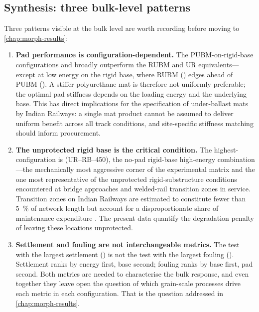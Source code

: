 \subsection{Synthesis: three bulk-level patterns}

Three patterns visible at the bulk level are worth recording before moving
to \cref{chap:morph-results}:

\begin{enumerate}[label=(\arabic*),leftmargin=*]
    \item \textbf{Pad performance is configuration-dependent.}
          The \gls{PUBM}-on-rigid-base configurations  and
           broadly outperform the \gls{RUBM} and \gls{UR}
          equivalents---except at low energy on the rigid base, where
          \gls{RUBM} () edges ahead of \gls{PUBM}
          (). A stiffer polyurethane mat is therefore not
          uniformly preferable; the optimal pad stiffness depends on the
          loading energy and the underlying base. This has direct
          implications for the specification of under-ballast mats by
          Indian Railways: a single mat product cannot be assumed to
          deliver uniform benefit across all track conditions, and
          site-specific stiffness matching should inform procurement.
    \item \textbf{The unprotected rigid base is the critical condition.}
          The highest-\FIIN{} configuration is 
          (\gls{UR}--\gls{RB}--450), the no-pad rigid-base high-energy
          combination---the mechanically most aggressive corner of the
          experimental matrix and the one most representative of the
          unprotected rigid-substructure conditions encountered at bridge
          approaches and welded-rail transition zones in service.
          Transition zones on Indian Railways are estimated to constitute
          fewer than \SI{5}{\percent} of network length but account for a
          disproportionate share of maintenance expenditure
          \citep{Indraratna2011}. The present data quantify the
          degradation penalty of leaving these locations unprotected.
    \item \textbf{Settlement and fouling are not interchangeable metrics.}
          The test with the largest settlement () is not the
          test with the largest fouling (). Settlement ranks
          by energy first, base second; fouling ranks by base first, pad
          second. Both metrics are needed to characterise the bulk
          response, and even together they leave open the question of
          which grain-scale processes drive each metric in each
          configuration. That is the question addressed in
          \cref{chap:morph-results}.
\end{enumerate}

